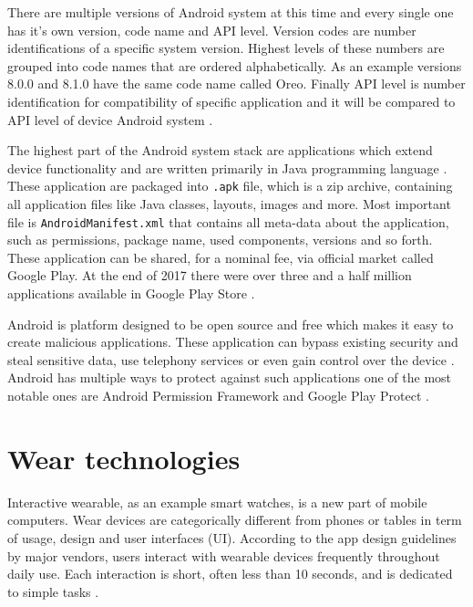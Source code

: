 There are multiple versions of Android system at this time and every single one has it's own version, code name and API level. Version codes are number identifications of a specific system version. Highest levels of these numbers are grouped into code names that are ordered alphabetically. As an example versions 8.0.0 and 8.1.0 have the same code name called Oreo. Finally API level is number identification for compatibility of specific application and it will be compared to API level of device Android system \cite{AOSP}\cite{AD}.

The highest part of the Android system stack are applications which extend device functionality and are written primarily in Java programming language \cite{SoASTaD}. These application are packaged into \verb|.apk| file, which is a zip archive, containing all application files like Java classes, layouts, images and more. Most important file is \verb|AndroidManifest.xml| that contains all meta-data about the application, such as permissions, package name, used components, versions and so forth. These application can be shared, for a nominal fee, via official market called Google Play. At the end of 2017 there were over three and a half million applications available in Google Play Store \cite{SoASTaD}\cite{NoAAiGPS}\cite{NoAA}.

Android is platform designed to be open source and free which makes it easy to create malicious applications. These application can bypass existing security and steal sensitive data, use telephony services or even gain control over the device \cite{ASIMPD}. Android has multiple ways to protect against such applications one of the most notable ones are Android Permission Framework and Google Play Protect \cite{SoASTaD}.


\section{Wear technologies}\label{sec:WearTechnologies}
Interactive wearable, as an example smart watches, is a new part of mobile computers. Wear devices are categorically different from phones or tables in term of usage, design and user interfaces (UI). According to the app design guidelines by major vendors, users interact with wearable devices frequently throughout daily use. Each interaction is short, often less than 10 seconds, and is dedicated to simple tasks \cite{UtCoAWO}. 

